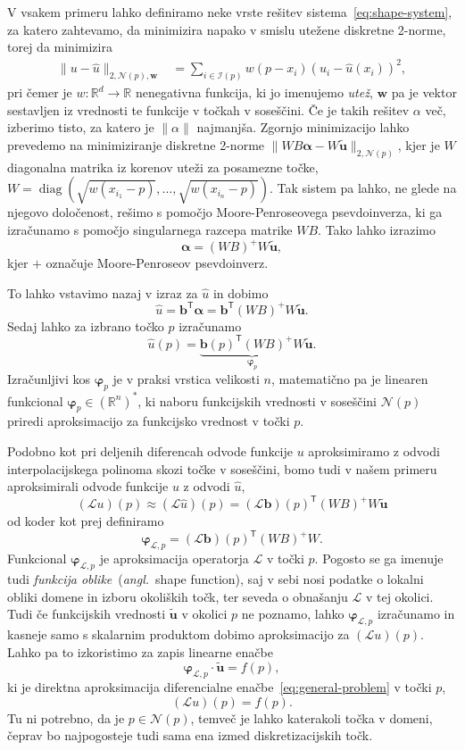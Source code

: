 \documentclass[12pt,a4paper,twoside]{article}
\theoremstyle{definition} %
\theoremstyle{plain} %
\numberwithin{equation}{section}
\newcommand{\R}{\mathbb R}
\newcommand{\Nc}{\mathcal{N}}
\newcommand{\I}{\mathcal{I}}
\renewcommand{\L}{\mathcal{L}}
\newcommand{\T}{\mathsf{T}}
\renewcommand{\b}{\boldsymbol}
\renewcommand{\phi}{\varphi}
\newcommand{\uh}{\hat{u}}
\DeclareMathOperator{\diag}{diag}
\newcommand{\ang}[1]{(\textit{angl.}\ #1)}
\begin{document}
V vsakem primeru lahko definiramo neke vrste rešitev sistema~\eqref{eq:shape-system},
za katero zahtevamo, da minimizira napako v smislu utežene diskretne 2-norme, torej da minimizira
\begin{align*}
  \|u-\uh\|_{2,\Nc(p),\b{w}} &= \sum_{i\in \I(p)} w(p-x_i) (u_i - \uh(x_i))^2,
\end{align*}
pri čemer je $w\colon\R^d\to\R$ nenegativna funkcija, ki jo imenujemo \emph{utež}, $\b{w}$ pa je
vektor sestavljen iz vrednosti te funkcije v točkah v soseščini.  Če je takih rešitev $\alpha$ več,
izberimo tisto, za katero je $\|\alpha\|$ najmanjša.  Zgornjo minimizacijo lahko prevedemo na
minimiziranje diskretne 2-norme $\|WB\b{\alpha}-W\b{\tilde{u}}\|_{2,\Nc(p)}$, kjer je $W$ diagonalna
matrika iz korenov uteži za posamezne točke, $W = \diag(\sqrt{w(x_{i_1}-p)}, \dots,
\sqrt{w(x_{i_n}-p)})$. Tak sistem pa lahko, ne glede na njegovo določenost, rešimo s pomočjo
Moore-Penroseovega psevdoinverza, ki ga izračunamo s pomočjo singularnega razcepa matrike $WB$.
Tako lahko izrazimo \[ \b{\alpha} = (WB)^{+}W\b{\tilde u}, \]
kjer $+$ označuje Moore-Penroseov psevdoinverz.

To lahko vstavimo nazaj v izraz za $\hat{u}$ in dobimo
\[
  \hat{u} = \b{b}^\T\b{\alpha} = \b{b}^\T(WB)^{+}W\b{\tilde{u}}.
\]
Sedaj lahko za izbrano točko $p$ izračunamo
\[
  \hat{u}(p) = \underbrace{\b{b}(p)^\T(WB)^{+}W}_{\b\phi_p}\b{\tilde{u}}.
\]
Izračunljivi kos $\b\phi_p$ je v praksi vrstica velikosti $n$, matematično pa je
linearen funkcional $\b\phi_p \in (\R^n)^\ast$, ki naboru funkcijskih vrednosti v
soseščini $\Nc(p)$ priredi aproksimacijo za funkcijsko vrednost v točki $p$.

Podobno kot pri deljenih diferencah odvode funkcije $u$ aproksimiramo z odvodi
interpolacijskega polinoma skozi točke v soseščini, bomo tudi v našem primeru
aproksimirali odvode funkcije $u$ z odvodi $\uh$,
\[
  (\L u)(p) \approx (\L \uh)(p) = (\L\b{b})(p)^\T(WB)^{+}W \b{\tilde{u}}
\]
od koder kot prej definiramo
\begin{equation}
  \b\phi_{\L,p} = (\L\b{b})(p)^\T(WB)^{+}W.
  \label{eq:shape-definition}
\end{equation}
Funkcional $\b\phi_{\L,p}$ je aproksimacija operatorja $\L$ v točki $p$.
Pogosto se ga imenuje tudi \emph{funkcija oblike}~\ang{shape function}, saj v
sebi nosi podatke o lokalni obliki domene in izboru okoliških točk, ter seveda o
obnašanju $\L$ v tej okolici. Tudi če funkcijskih vrednosti $\b{\tilde{u}}$ v
okolici $p$ ne poznamo, lahko $\b\phi_{\L, p}$ izračunamo in kasneje samo s
skalarnim produktom dobimo aproksimacijo za $(\L u)(p)$. Lahko pa to izkoristimo
za zapis linearne enačbe
\[
  \b\phi_{\L,p} \cdot \b{\tilde{u}} = f(p),
\]
ki je direktna aproksimacija diferencialne enačbe~\eqref{eq:general-problem} v točki $p$,
\[
  (\L u)(p) = f(p).
\]
Tu ni potrebno, da je $p \in \Nc(p)$, temveč je lahko katerakoli točka v domeni, čeprav bo
najpogosteje tudi sama ena izmed diskretizacijskih točk.
\end{document}
